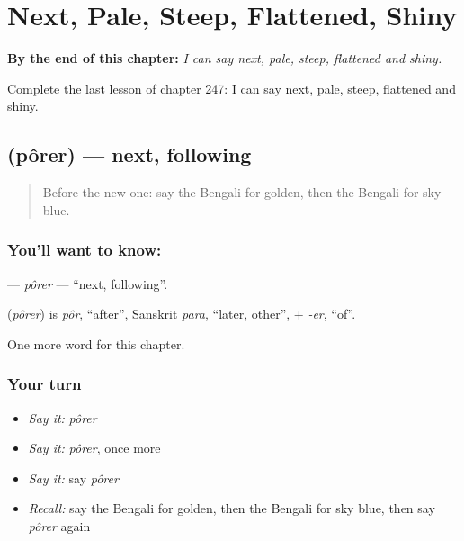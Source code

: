 
\chapter{Next, Pale, Steep, Flattened, Shiny}
\label{ch:bn-next-pale-steep-flattened-shiny}

\begin{chapteropening}
\textbf{By the end of this chapter:} \emph{I can say next, pale, steep, flattened and shiny.}

Complete the last lesson of chapter 247: I can say next, pale, steep, flattened and shiny.
\end{chapteropening}

\section[\texorpdfstring{\bn{পরের} (pôrer)}{পরের (pôrer)}]{ (pôrer) — next, following}

\label{lesson:BN-C247-porer}



\begin{quote}
Before the new one: say the Bengali for golden, then the Bengali for sky blue.
\end{quote}

\subsection*{You'll want to know: }
\textbf{} — \emph{pôrer} — \textquotedblleft{}next, following\textquotedblright{}.

\begin{cousinweb}
\textbf{} (\emph{pôrer}) is \emph{pôr}, \textquotedblleft{}after\textquotedblright{}, Sanskrit \emph{para}, \textquotedblleft{}later, other\textquotedblright{}, + \emph{-er}, \textquotedblleft{}of\textquotedblright{}.
\end{cousinweb}

\begin{grammarlens}[title={What you've built}]
One more word for this chapter.
\end{grammarlens}

\subsection*{Your turn}
\begin{itemize}
\raggedright
  \item \emph{Say it:} \emph{pôrer}
  \item \emph{Say it:} \emph{pôrer}, once more
  \item \emph{Say it:} say \emph{pôrer}
  \item \emph{Recall:} say the Bengali for golden, then the Bengali for sky blue, then say \emph{pôrer} again
\end{itemize}

